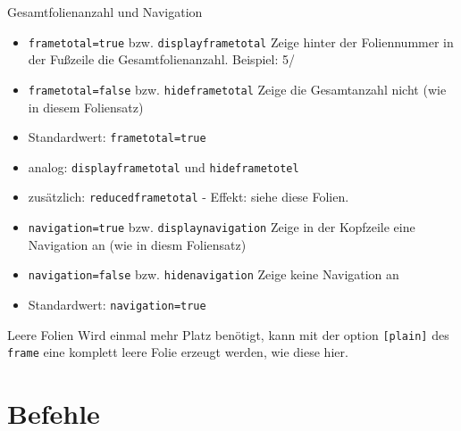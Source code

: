 \documentclass[german,10pt,xcolor=colortbl,compress
]{beamer}
\begin{document}
\begin{frame}{Gesamtfolienanzahl und Navigation}
	\begin{itemize}
		\item \lstinline|frametotal=true| bzw. \lstinline|displayframetotal| Zeige hinter der Foliennummer in der Fußzeile die Gesamtfolienanzahl. Beispiel: 5/\inserttotalframenumber
		\item \lstinline|frametotal=false| bzw. \lstinline|hideframetotal| Zeige die Gesamtanzahl nicht (wie in diesem Foliensatz)
		\item Standardwert: \lstinline|frametotal=true|
		\item analog: \lstinline|displayframetotal| und \lstinline|hideframetotel|
		\item zusätzlich: \lstinline|reducedframetotal| - Effekt: siehe diese Folien.
	\end{itemize}
	\vspace{\baselineskip}
	\begin{itemize}
		\item \lstinline|navigation=true| bzw. \lstinline|displaynavigation| Zeige in der Kopfzeile eine Navigation an (wie in diesm Foliensatz)
		\item \lstinline|navigation=false| bzw. \lstinline|hidenavigation| Zeige keine Navigation an
		\item Standardwert: \lstinline|navigation=true|
	\end{itemize}
\end{frame}
\begin{frame}[plain]{Leere Folien}
	Wird einmal mehr Platz benötigt, kann mit der option \lstinline|[plain]| des \lstinline|frame| eine komplett leere Folie erzeugt werden, wie diese hier.
\end{frame}
\section{Befehle}
\end{document}
